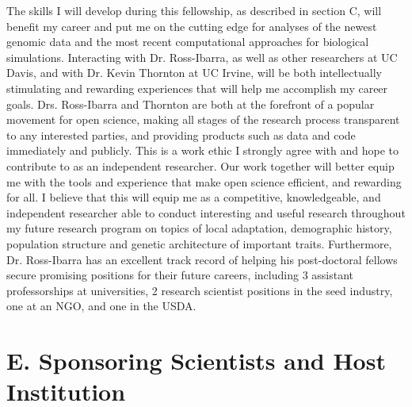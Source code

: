 The skills I will develop during this fellowship, as described in section C, will benefit my career and put me on the cutting edge for analyses of the newest genomic data and the most recent computational approaches for biological simulations. Interacting with Dr. Ross\--Ibarra, as well as other researchers at UC Davis, and with Dr. Kevin Thornton at UC Irvine, will be both intellectually stimulating and rewarding experiences that will help me accomplish my career goals. Drs. Ross\--Ibarra and Thornton are both at the forefront of a popular movement for open science, making all stages of the research process transparent to any interested parties, and providing products such as data and code immediately and publicly. This is a work ethic I strongly agree with and hope to contribute to as an independent researcher. Our work together will better equip me with the tools and experience that make open science efficient, and rewarding for all. I believe that this will equip me as a competitive, knowledgeable, and independent researcher able to conduct interesting and useful research throughout my future research program on topics of local adaptation, demographic history, population structure and genetic architecture of important traits. Furthermore, Dr. Ross-Ibarra has an excellent track record of helping his post-doctoral fellows secure promising positions for their future careers, including 3 assistant professorships at universities, 2 research scientist positions in the seed industry, one at an NGO, and one in the USDA. 

\section*{E. Sponsoring Scientists and Host Institution}

